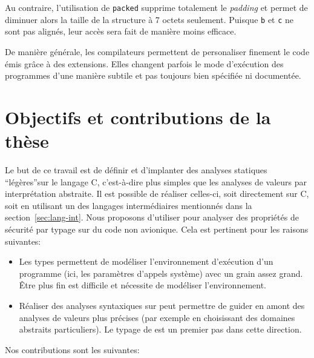 Au contraire, l'utilisation de \texttt{packed} supprime totalement le
\emph{padding} et permet de diminuer alors la taille de la structure à 7 octets
seulement. Puisque \texttt{b} et \texttt{c} ne sont pas alignés, leur accès sera
fait de manière moins efficace.

De manière générale, les compilateurs permettent de personaliser finement le
code émis grâce à des extensions. Elles changent parfois le mode d'exécution des
programmes d'une manière subtile et pas toujours bien spécifiée ni documentée.

\section{Objectifs et contributions de la thèse}

Le but de ce travail est de définir et d'implanter des analyses statiques
\enquote{légères}sur le langage C, c'est-à-dire plus simples que les analyses de
valeurs par interprétation abstraite. Il est possible de réaliser celles-ci,
soit directement sur C, soit en utilisant un des langages intermédiaires
mentionnés dans la section~\ref{sec:lang-int}. Nous proposons d'utiliser
\newspeak pour analyser des propriétés de sécurité par typage sur du code non
avionique. Cela est pertinent pour les raisons suivantes:

\begin{itemize}

\item
Les types permettent de modéliser l'environnement d'exécution d'un
programme (ici, les paramètres d'appels système) avec un grain assez grand. Être
plus fin est difficile et nécessite de modéliser l'environnement.

\item
Réaliser des analyses syntaxiques sur \newspeak peut permettre de guider en
amont des analyses de valeurs plus précises (par exemple en choisissant des
domaines abstraits particuliers). Le typage de \newspeak est un premier pas dans
cette direction.


\end{itemize}

Nos contributions sont les suivantes:


